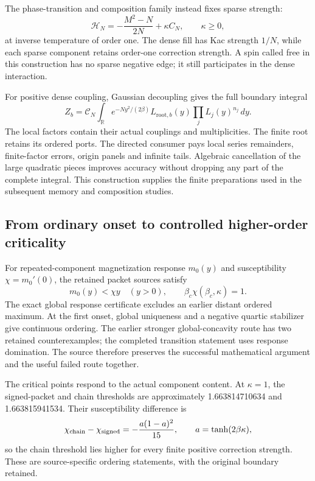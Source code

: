 The phase-transition and composition family instead fixes sparse strength:
\begin{equation}
 \mathcal H_N=-\frac{M^2-N}{2N}+\kappa C_N,
 \qquad \kappa\geq0,
\end{equation}
at inverse temperature of order one. The dense fill has Kac strength $1/N$, while each sparse component retains order-one correction strength. A spin called free in this construction has no sparse negative edge; it still participates in the dense interaction.

For positive dense coupling, Gaussian decoupling gives the full boundary integral
\begin{equation}
 Z_b=\mathcal C_N\int_{\mathbb R}e^{-Ny^2/(2\beta)}
 L_{\mathrm{root},b}(y)\prod_jL_j(y)^{n_j}\,dy.
\end{equation}
The local factors contain their actual couplings and multiplicities. The finite root retains its ordered ports. The directed consumer pays local series remainders, finite-factor errors, origin panels and infinite tails. Algebraic cancellation of the large quadratic pieces improves accuracy without dropping any part of the complete integral. This construction supplies the finite preparations used in the subsequent memory and composition studies.

\subsection{From ordinary onset to controlled higher-order criticality}

For repeated-component magnetization response $m_0(y)$ and susceptibility $\chi=m_0'(0)$, the retained packet sources satisfy
\begin{equation}
 m_0(y)<\chi y\quad(y>0),\qquad
 \beta_c\chi(\beta_c,\kappa)=1.
\end{equation}
The exact global response certificate excludes an earlier distant ordered maximum. At the first onset, global uniqueness and a negative quartic stabilizer give continuous ordering. The earlier stronger global-concavity route has two retained counterexamples; the completed transition statement uses response domination. The source therefore preserves the successful mathematical argument and the useful failed route together.

The critical points respond to the actual component content. At $\kappa=1$, the signed-packet and chain thresholds are approximately 1.663814710634 and 1.663815941534. Their susceptibility difference is
\begin{equation}
 \chi_{\rm chain}-\chi_{\rm signed}
 =-\frac{a(1-a)^2}{15},\qquad a=\tanh(2\beta\kappa),
\end{equation}
so the chain threshold lies higher for every finite positive correction strength. These are source-specific ordering statements, with the original boundary retained.

